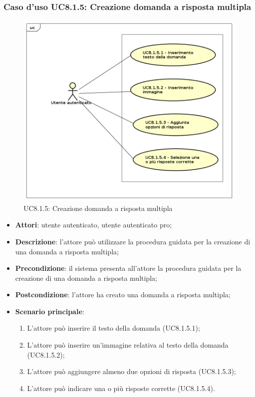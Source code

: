 \subsubsection{Caso d'uso UC8.1.5: Creazione domanda a risposta multipla}
	\label{UC8.1.5}
	\begin{figure}[h]
		\centering
			\includegraphics[scale=0.45,keepaspectratio]{UML/UC8_1_5.png}
		\caption{UC8.1.5: Creazione domanda a risposta multipla}
	\end{figure}
	\FloatBarrier
	\begin{itemize}
		\item
			\textbf{Attori}: utente autenticato, utente autenticato pro;
		\item		
			\textbf{Descrizione}: l'attore può utilizzare la procedura guidata per la creazione di una domanda a risposta multipla;
		\item
			\textbf{Precondizione}: il sistema presenta all'attore la procedura guidata per la creazione di una domanda a risposta multipla;
		\item
			\textbf{Postcondizione}: l'attore ha creato una domanda a risposta multipla;
		\item
			\textbf{Scenario principale}:
	       		\begin{enumerate}
	       			\item
	       			L'attore può inserire il testo della domanda (UC8.1.5.1);
	       			\item
	       			L'attore può inserire un'immagine relativa al testo della domanda (UC8.1.5.2);
	       			\item
	       			L'attore può aggiungere almeno due opzioni di risposta (UC8.1.5.3);
					\item
					L'attore può indicare una o più risposte corrette (UC8.1.5.4).
	 			\end{enumerate}
	\end{itemize}

